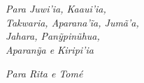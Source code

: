 \chapter*{}

\vspace*{\fill}

\begin{flushright}
\begin{minipage}{0.75\textwidth}
\hspace*{\fill}\textit{Para Juwi'ia, Kaaui'ia,\\ 
\hspace*{\fill}Takwaria, Aparana'ĩa, Jumã'a,\\ 
\hspace*{\fill}Jahara, Panỹpinũhua,\\
\hspace*{\fill}Aparanỹa e Kiripi'ia}

\bigskip
\hspace*{\fill}\emph{Para Rita e Tomé}
\end{minipage}
\end{flushright}

\thispagestyle{empty}




